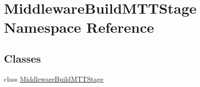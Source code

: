 \hypertarget{namespace_middleware_build_m_t_t_stage}{\section{Middleware\-Build\-M\-T\-T\-Stage Namespace Reference}
\label{namespace_middleware_build_m_t_t_stage}
}
\subsection*{Classes}
\begin{DoxyCompactItemize}
\item 
class \hyperlink{class_middleware_build_m_t_t_stage_1_1_middleware_build_m_t_t_stage}{Middleware\-Build\-M\-T\-T\-Stage}
\end{DoxyCompactItemize}
